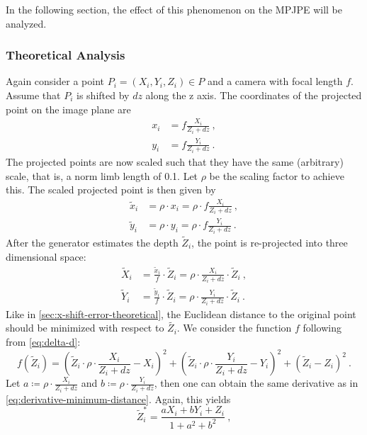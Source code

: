 In the following section, the effect of this phenomenon on the MPJPE will be analyzed.

\subsubsection{Theoretical Analysis}
Again consider a point $P_i=(X_i, Y_i, Z_i) \in P$ and a camera with focal length $f$. Assume that $P_i$ is shifted by $dz$ along the z axis.
The coordinates of the projected point on the image plane are
\begin{align}
	x_i &= f \frac{X_i}{Z_i + dz} \ , \\
	y_i &= f \frac{Y_i}{Z_i + dz} \ .
\end{align}
The projected points are now scaled such that they have the same (arbitrary) scale, that is, a norm limb length of 0.1.
Let $\rho$ be the scaling factor to achieve this.
The scaled projected point is then given by
\begin{align}
		\widetilde{x}_i &= \rho \cdot x_i 
		= \rho \cdot f \frac{X_i}{Z_i + dz} \ , \\
		\widetilde{y}_i &= \rho \cdot y_i
		= \rho \cdot f \frac{Y_i}{Z_i + dz} \ .
\end{align}
After the generator estimates the depth $\widetilde{Z}_i$, the point is re-projected into three dimensional space:
\begin{align}
	\widetilde{X}_i &= \frac{\widetilde{x}_i}{f} \cdot \widetilde{Z}_i
	= \rho \cdot \frac{X_i}{Z_i + dz} \cdot \widetilde{Z}_i \ , \\
	\widetilde{Y}_i &= \frac{\widetilde{y}_i}{f} \cdot \widetilde{Z}_i
	= \rho \cdot \frac{Y_i}{Z_i + dz}\cdot \widetilde{Z}_i \ .
\end{align}
Like in \autoref{sec:x-shift-error-theoretical}, the Euclidean distance to the original point should be minimized with respect to $\widetilde{Z_i}$.
We consider the function $f$ following from \autoref{eq:delta-d}:
\begin{equation}
	f(\widetilde{Z}_i) = \left ( \widetilde{Z}_i \cdot \rho  \cdot \frac{X_i}{Z_i + dz}- X_i \right)^2 + \left ( \widetilde{Z}_i \cdot \rho \cdot \frac{Y_i}{Z_i + dz} - Y_i \right)^2
					 + \left ( \widetilde{Z}_i - Z_i \right)^2 \ .
\end{equation}
Let $a \coloneqq \rho \cdot \frac{X_i}{Z_i + dz}$ and $b \coloneqq \rho \cdot \frac{Y_i}{Z_i + dz}$, then one can obtain the same derivative as in \autoref{eq:derivative-minimum-distance}.
Again, this yields
\begin{equation}
	\widetilde{Z}_i^\ast = \frac{a X_i + b Y_i + Z_i}{1 + a^2 + b^2} \ ,
\end{equation}
